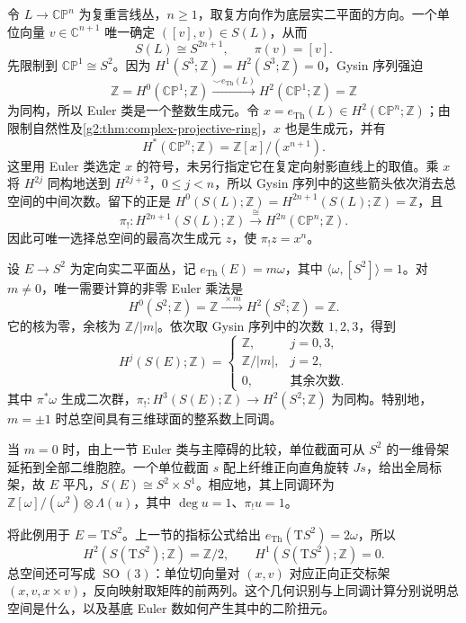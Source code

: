 \begin{example}\label{g2:exm:thom-hopf-gysin}
	令 \(L\to\mathbb{CP}^n\) 为复重言线丛，\(n\ge1\)，取复方向作为底层实二平面的方向。一个单位向量 \(v\in\mathbb C^{n+1}\) 唯一确定 \(([v],v)\in S(L)\)，从而
	\[
		S(L)\cong S^{2n+1},\qquad \pi(v)=[v].
	\]
	先限制到 \(\mathbb{CP}^1\cong S^2\)。因为 \(H^1(S^3;\mathbb Z)=H^2(S^3;\mathbb Z)=0\)，Gysin 序列强迫
	\[
		\mathbb Z=H^0(\mathbb{CP}^1;\mathbb Z)\xrightarrow{\smile e_{\mathrm{Th}}(L)}H^2(\mathbb{CP}^1;\mathbb Z)=\mathbb Z
	\]
	为同构，所以 Euler 类是一个整数生成元。令 \(x=e_{\mathrm{Th}}(L)\in H^2(\mathbb{CP}^n;\mathbb Z)\)；由限制自然性及\cref{g2:thm:complex-projective-ring}，\(x\) 也是生成元，并有
	\[
		H^*(\mathbb{CP}^n;\mathbb Z)=\mathbb Z[x]/(x^{n+1}).
	\]
	这里用 Euler 类选定 \(x\) 的符号，未另行指定它在复定向射影直线上的取值。乘 \(x\) 将 \(H^{2j}\) 同构地送到 \(H^{2j+2}\)，\(0\le j<n\)，所以 Gysin 序列中的这些箭头依次消去总空间的中间次数。留下的正是 \(H^0(S(L);\mathbb Z)=H^{2n+1}(S(L);\mathbb Z)=\mathbb Z\)，且
	\[
		\pi_!:H^{2n+1}(S(L);\mathbb Z)\xrightarrow{\cong}H^{2n}(\mathbb{CP}^n;\mathbb Z).
	\]
	因此可唯一选择总空间的最高次生成元 \(z\)，使 \(\pi_!z=x^n\)。
\end{example}

\begin{example}\label{g2:exm:circle-bundle-euler-integer}
	设 \(E\to S^2\) 为定向实二平面丛，记 \(e_{\mathrm{Th}}(E)=m\omega\)，其中 \(\langle\omega,[S^2]\rangle=1\)。对 \(m\ne0\)，唯一需要计算的非零 Euler 乘法是
	\[
		H^0(S^2;\mathbb Z)=\mathbb Z\xrightarrow{\ \times m\ }H^2(S^2;\mathbb Z)=\mathbb Z.
	\]
	它的核为零，余核为 \(\mathbb Z/|m|\)。依次取 Gysin 序列中的次数 \(1,2,3\)，得到
	\[
		H^j(S(E);\mathbb Z)=
		\begin{cases}
			\mathbb Z,&j=0,3,\\
			\mathbb Z/|m|,&j=2,\\
			0,&\text{其余次数}.
		\end{cases}
	\]
	其中 \(\pi^*\omega\) 生成二次群，\(\pi_!:H^3(S(E);\mathbb Z)\to H^2(S^2;\mathbb Z)\) 为同构。特别地，\(m=\pm1\) 时总空间具有三维球面的整系数上同调。
	
	当 \(m=0\) 时，由上一节 Euler 类与主障碍的比较，单位截面可从 \(S^2\) 的一维骨架延拓到全部二维胞腔。一个单位截面 \(s\) 配上纤维正向直角旋转 \(Js\)，给出全局标架，故 \(E\) 平凡，\(S(E)\cong S^2\times S^1\)。相应地，其上同调环为 \(\mathbb Z[\omega]/(\omega^2)\otimes\Lambda(u)\)，其中 \(\deg u=1\)、\(\pi_!u=1\)。
\end{example}

将此例用于 \(E=\mathrm TS^2\)。上一节的指标公式给出 \(e_{\mathrm{Th}}(\mathrm TS^2)=2\omega\)，所以
\begin{equation}\label{g2:eq:unit-tangent-sphere-cohomology}
	H^2(S(\mathrm TS^2);\mathbb Z)=\mathbb Z/2,
	\qquad H^1(S(\mathrm TS^2);\mathbb Z)=0.
\end{equation}
总空间还可写成 \(\operatorname{SO}(3)\)：单位切向量对 \((x,v)\) 对应正向正交标架 \((x,v,x\times v)\)，反向映射取矩阵的前两列。这个几何识别与上同调计算分别说明总空间是什么，以及基底 Euler 数如何产生其中的二阶扭元。

